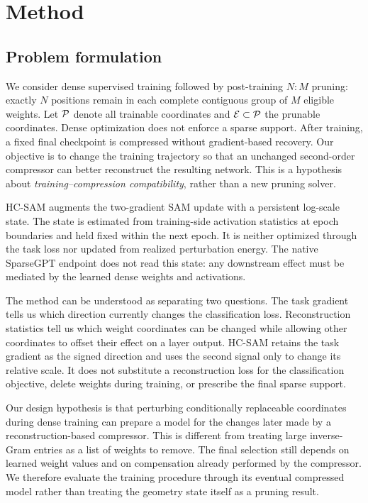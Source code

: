 \section{Method}
\label{sec:method}
\subsection{Problem formulation}
We consider dense supervised training followed by post-training $N{:}M$ pruning: exactly $N$ positions remain in each complete contiguous group of $M$ eligible weights. Let $\mathcal{P}$ denote all trainable coordinates and $\mathcal{E}\subset\mathcal{P}$ the prunable coordinates. Dense optimization does not enforce a sparse support. After training, a fixed final checkpoint is compressed without gradient-based recovery. Our objective is to change the training trajectory so that an unchanged second-order compressor can better reconstruct the resulting network. This is a hypothesis about \emph{training--compression compatibility}, rather than a new pruning solver.

HC-SAM augments the two-gradient SAM update with a persistent log-scale state. The state is estimated from training-side activation statistics at epoch boundaries and held fixed within the next epoch. It is neither optimized through the task loss nor updated from realized perturbation energy. The native SparseGPT endpoint does not read this state: any downstream effect must be mediated by the learned dense weights and activations.

The method can be understood as separating two questions. The task gradient tells us which direction currently changes the classification loss. Reconstruction statistics tell us which weight coordinates can be changed while allowing other coordinates to offset their effect on a layer output. HC-SAM retains the task gradient as the signed direction and uses the second signal only to change its relative scale. It does not substitute a reconstruction loss for the classification objective, delete weights during training, or prescribe the final sparse support.

Our design hypothesis is that perturbing conditionally replaceable coordinates during dense training can prepare a model for the changes later made by a reconstruction-based compressor. This is different from treating large inverse-Gram entries as a list of weights to remove. The final selection still depends on learned weight values and on compensation already performed by the compressor. We therefore evaluate the training procedure through its eventual compressed model rather than treating the geometry state itself as a pruning result.

